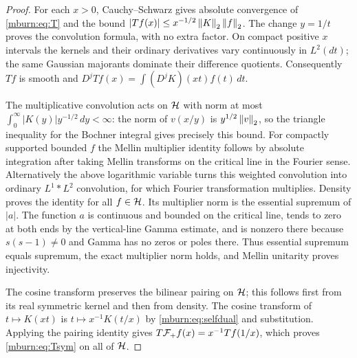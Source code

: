 \begin{proof}
For each $x>0$, Cauchy--Schwarz gives absolute convergence of
\eqref{mburn:eq:T} and the bound
$|Tf(x)|\leq x^{-1/2}\left\lVert K\right\rVert_2\left\lVert f\right\rVert_2$.
The change $y=1/t$ proves the convolution formula, with no extra
factor. On compact positive $x$ intervals the kernels and their
ordinary derivatives vary continuously in $L^2(dt)$; the same
Gaussian majorants dominate their difference quotients. Consequently
$Tf$ is smooth and $D^jTf(x)=\int(D^jK)(xt)f(t)\,dt$.

The multiplicative convolution acts on $\mathcal H$ with norm at most
$\int_0^\infty|K(y)|y^{-1/2}\,dy<\infty$:
the norm of $v(x/y)$ is $y^{1/2}\left\lVert v\right\rVert_2$, so the triangle
inequality for the Bochner integral gives precisely this bound.
For compactly supported bounded $f$ the Mellin multiplier identity
follows by absolute integration after taking Mellin transforms on
the critical line in the Fourier sense. Alternatively the above
logarithmic variable turns this weighted convolution into ordinary
$L^1*L^2$ convolution, for which Fourier transformation multiplies.
Density proves the identity for all $f\in\mathcal H$. Its multiplier
norm is the essential supremum of $|a|$. The function $a$ is
continuous and bounded on the critical line, tends to zero at both
ends by the vertical-line Gamma estimate, and is nonzero there
because $s(s-1)\ne0$ and Gamma has no zeros or poles there.
Thus essential supremum equals supremum, the exact multiplier
norm holds, and Mellin unitarity proves injectivity.

The cosine transform preserves the bilinear pairing on $\mathcal H$;
this follows first from its real symmetric kernel and then from
density. The cosine transform of $t\mapsto K(xt)$ is
$t\mapsto x^{-1}K(t/x)$ by \eqref{mburn:eq:selfdual} and substitution.
Applying the pairing identity gives $T\mathcal F_+ f(x)=x^{-1}Tf(1/x)$,
which proves \eqref{mburn:eq:Tsym} on all of $\mathcal H$.


\end{proof}
